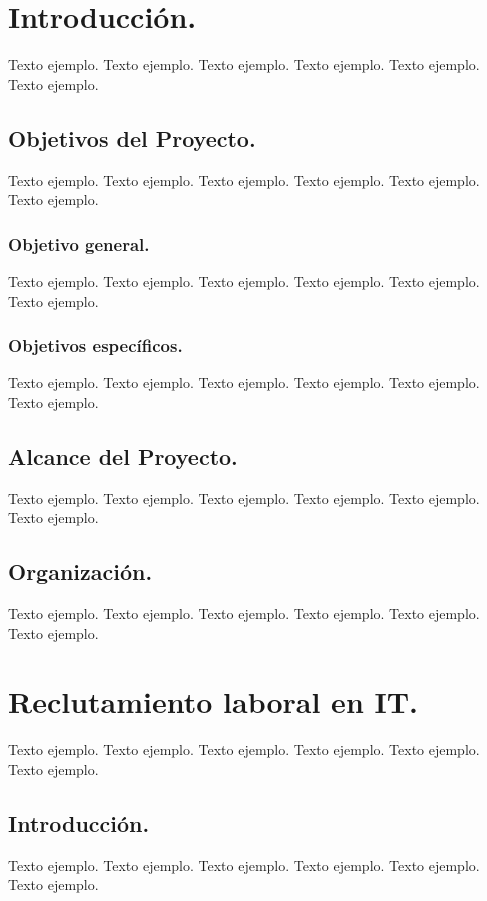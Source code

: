 \documentclass[12pt,a4paper]{article}
\begin{document}
\tableofcontents 	%

\cleardoublepage    %

\section{Introducción.}
Texto ejemplo. Texto ejemplo. Texto ejemplo. Texto ejemplo. Texto ejemplo. Texto ejemplo.

\subsection{Objetivos del Proyecto.}
Texto ejemplo. Texto ejemplo. Texto ejemplo. Texto ejemplo. Texto ejemplo. Texto ejemplo.

\subsubsection{Objetivo general.}
Texto ejemplo. Texto ejemplo. Texto ejemplo. Texto ejemplo. Texto ejemplo. Texto ejemplo.

\subsubsection{Objetivos específicos.}
Texto ejemplo. Texto ejemplo. Texto ejemplo. Texto ejemplo. Texto ejemplo. Texto ejemplo.

\subsection{Alcance del Proyecto.}
Texto ejemplo. Texto ejemplo. Texto ejemplo. Texto ejemplo. Texto ejemplo. Texto ejemplo.

\subsection{Organización.}
Texto ejemplo. Texto ejemplo. Texto ejemplo. Texto ejemplo. Texto ejemplo. Texto ejemplo.

\section{Reclutamiento laboral en IT.}
Texto ejemplo. Texto ejemplo. Texto ejemplo. Texto ejemplo. Texto ejemplo. Texto ejemplo.

\subsection{Introducción.}
Texto ejemplo. Texto ejemplo. Texto ejemplo. Texto ejemplo. Texto ejemplo. Texto ejemplo.
\end{document}
